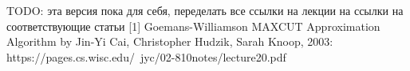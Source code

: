 \documentclass{article}
\begin{document}











TODO: эта версия пока для себя, переделать все ссылки на лекции на ссылки на соответствующие статьи
[1] Goemans-Williamson MAXCUT Approximation Algorithm by Jin-Yi Cai, Christopher Hudzik, Sarah Knoop, 2003:
https://pages.cs.wisc.edu/~jyc/02-810notes/lecture20.pdf \\
\end{document}

